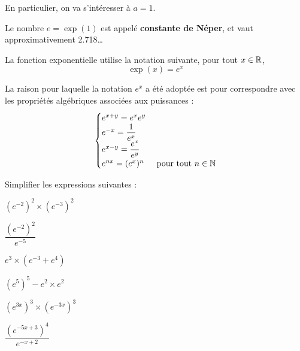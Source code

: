\documentclass{poly}
\begin{document}
En particulier, on va s'intéresser à $a = 1$.
\begin{definition}
Le nombre $e = \exp(1)$ est appelé \textbf{constante de Néper}, et vaut approximativement \num{2,718}\dots

La fonction exponentielle utilise la notation suivante, pour tout $x \in \mathbb{R}$,
\begin{equation*}
\exp(x) = e^x
\end{equation*}
\end{definition}
\begin{remark}
La raison pour laquelle la notation $e^x$ a été adoptée est pour correspondre avec les propriétés algébriques associées aux puissances :
\begin{equation*}
\begin{cases}
e^{x + y} = e^x e^y\\
e^{-x} = \dfrac{1}{e^x}\\
e^{x - y} = \dfrac{e^x}{e^y}\\
e^{nx} = (e^x)^n & \text{ pour tout } n \in \mathbb{N} 
\end{cases}
\end{equation*}
\end{remark}
\begin{example}
Simplifier les expressions suivantes :
\begin{alphaquestions}
\item $(e^{-2})^2 \times (e^{-3})^2$
\item $\dfrac{(e^{-2})^2}{e^{-5}}$
\item $e^3 \times (e^{-3} + e^4)$
\item $(e^5)^5 - e^2 \times e^2$
\item $(e^{3x})^3 \times (e^{-3x})^3$
\item $\dfrac{(e^{-5x+3})^4}{e^{-x+2}}$
\end{alphaquestions}
\end{example}
\newpage
\end{document}
